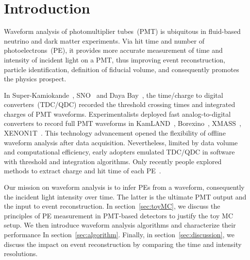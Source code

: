 \section{Introduction}
\label{sec:introduction}

Waveform analysis of photomultiplier tubes~(PMT) is ubiquitous in fluid-based neutrino and dark matter experiments.  Via hit time and number of photoelectrons~(PE), it provides more accurate measurement of time and intensity of incident light on a PMT, thus improving event reconstruction, particle identification, definition of fiducial volume, and consequently promotes the physics prospect.

In Super-Kamiokande~\cite{noauthor_super-kamiokande_2003}, SNO~\cite{dunger_event_2019} and Daya Bay~\cite{daya_bay_collaboration_measurement_2017}, the time/charge to digital converters~(TDC/QDC) recorded the threshold crossing times and integrated charges of PMT waveforms.  Experimentalists deployed fast analog-to-digital converters to record full PMT waveforms in KamLAND~\cite{kamland_collaboration_production_2010}, Borexino~\cite{alimonti_borexino_2009}, XMASS~\cite{abe_xmass_2013}, XENON1T~\cite{xenon_collaboration_xenon1t_2019}.  This technology advancement opened the flexibility of offline waveform analysis after data acquisition.  Nevertheless, limited by data volume and computational efficiency, early adopters emulated TDC/QDC in software with threshold and integration algorithms.  Only recently people explored methods to extract charge and hit time of each PE~\cite{zhang_comparison_2019}.

Our mission on waveform analysis is to infer PEs from a waveform, consequently the incident light intensity over time.  The latter is the ultimate PMT output and the input to event reconstruction.  In section~\ref{sec:toyMC}, we discuss the principles of PE measurement in PMT-based detectors to justify the toy MC setup.  We then introduce waveform analysis algorithms and characterize their performance In section~\ref{sec:algorithm}.  Finally, in section~\ref{sec:discussion}, we discuss the impact on event reconstruction by comparing the time and intensity resolutions.
